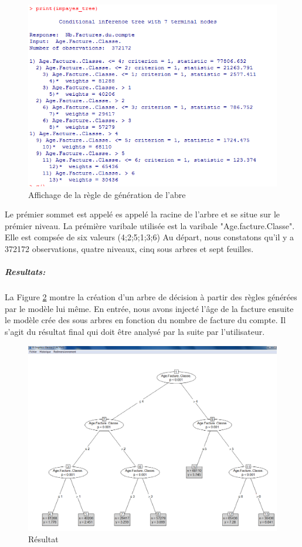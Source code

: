 \documentclass[11pt,a4paper]{report}
\begin{document}
\begin{figure}[h]
   \centering
   \includegraphics[scale=0.83]  {nbFacturecompte_age_factureclasse_tree_condition.PNG}
     \caption{Affichage de la règle de génération de l'abre}
     \label{figure15}
 
\end{figure}
Le prémier sommet est appelé  es appelé la racine de l'arbre et se situe sur le prémier niveau. La prémière varibale utilisée est la varibale "Age.facture.Classe". Elle est compsée de six valeurs (4;2;5;1;3;6) 
Au départ, nous constatons qu'il y a 372172 observations, quatre niveaux, cinq sous arbres et sept feuilles.  
\newpage
\subparagraph{Resultats:}
La Figure \ref{figure16} montre la création d'un arbre de décision à partir des règles générées par le modèle lui même. En entrée, nous avons injecté l'âge de la facture ensuite le modèle crée des sous arbres en fonction du nombre de facture du compte. Il s'agit du résultat final qui doit être analysé par la suite par l'utilisateur. 
\begin{figure}[h]
   \centering
   \includegraphics[scale=0.45]{ageclassenbfaturesimple_tree.PNG}
     \caption{Résultat}
     \label{figure16}
\end{figure}
\end{document}

